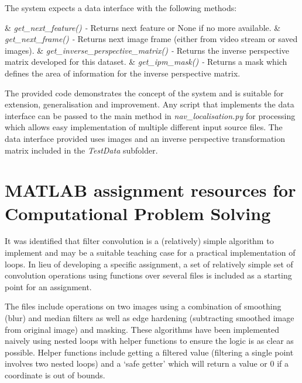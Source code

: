 \documentclass{article}
\begin{document}
The system expects a data interface with the following methods:

\begin{easylist}[itemize]
	& \textit{get\_next\_feature() -} Returns next feature or None if no more available.
	& \textit{get\_next\_frame() -}	Returns next image frame (either from video stream or saved images).
	& \textit{get\_inverse\_perspective\_matrix() -} Returns the inverse perspective matrix developed for this dataset.
	& \textit{get\_ipm\_mask() -} Returns a mask which defines the area of information for the inverse perspective matrix.
\end{easylist}

The provided code demonstrates the concept of the system and is suitable for extension, generalisation and improvement. Any script that implements the data interface can be passed to the main method in \textit{nav\_localisation.py} for processing which allows easy implementation of multiple different input source files. The data interface provided uses images and an inverse perspective transformation matrix included in the \textit{TestData} subfolder. 


\section{MATLAB assignment resources for Computational Problem Solving}

It was identified that filter convolution is a (relatively) simple algorithm to implement and may be a suitable teaching case for a practical implementation of loops. In lieu of developing a specific assignment, a set of relatively simple set of convolution operations using functions over several files is included as a starting point for an assignment.

The files include operations on two images using a combination of smoothing (blur) and median filters as well as edge hardening (subtracting smoothed image from original image) and masking. These algorithms have been implemented naively using nested loops with helper functions to ensure the logic is as clear as possible. Helper functions include getting a filtered value (filtering a single point involves two nested loops) and a `safe getter' which will return a value or 0 if a coordinate is out of bounds.
\end{document}
